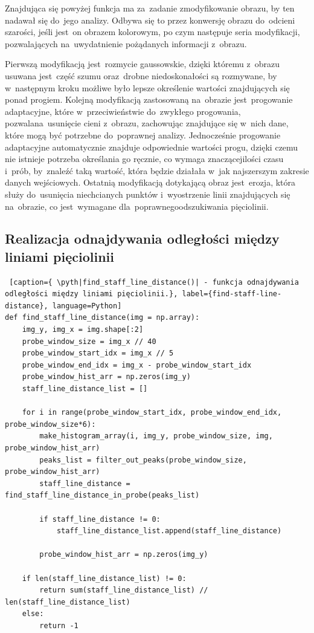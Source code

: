 Znajdująca się powyżej funkcja ma za~zadanie zmodyfikowanie obrazu, by ten nadawał się do~jego analizy. Odbywa się to przez konwersję obrazu do~odcieni szarości, jeśli jest~on obrazem kolorowym, po czym następuje seria modyfikacji, pozwalających na~uwydatnienie pożądanych \linebreak informacji z~obrazu.

Pierwszą modyfikacją jest~rozmycie gaussowskie, dzięki któremu z~obrazu usuwana jest~część szumu oraz~drobne niedoskonałości są rozmywane, by w~następnym kroku możliwe było lepsze określenie wartości znajdujących się ponad progiem. Kolejną modyfikacją zastosowaną na~obrazie jest~progowanie adaptacyjne, które w~przeciwieństwie do~zwykłego progowania, pozwala\linebreak na~usunięcie cieni z~obrazu, zachowując znajdujące się w~nich dane, które mogą być potrzebne do~poprawnej analizy. Jednocześnie progowanie adaptacyjne automatycznie znajduje odpowiednie wartości progu, dzięki czemu nie istnieje potrzeba określania go ręcznie, co wymaga znaczącej\linebreak ilości czasu i~prób, by~znaleźć taką wartość, która będzie działała w~jak najszerszym zakresie danych wejściowych. Ostatnią modyfikacją dotykającą obraz jest~erozja, która służy do~usunięcia niechcianych punktów i~wyostrzenie linii znajdujących się na~obrazie, co jest~wymagane dla~poprawnego\linebreak odszukiwania pięciolinii.

\newpage

\subsection{Realizacja odnajdywania odległości między liniami pięciolinii} \label{find_staff_line_distance_impl}

\begin{lstlisting} [caption={ \pyth|find_staff_line_distance()| - funkcja odnajdywania odległości między liniami pięciolinii.}, label={find-staff-line-distance}, language=Python]
def find_staff_line_distance(img = np.array):
	img_y, img_x = img.shape[:2]
	probe_window_size = img_x // 40
	probe_window_start_idx = img_x // 5
	probe_window_end_idx = img_x - probe_window_start_idx
	probe_window_hist_arr = np.zeros(img_y)
	staff_line_distance_list = []
	
	for i in range(probe_window_start_idx, probe_window_end_idx, probe_window_size*6):
		make_histogram_array(i, img_y, probe_window_size, img, probe_window_hist_arr)
		peaks_list = filter_out_peaks(probe_window_size, probe_window_hist_arr)
		staff_line_distance = find_staff_line_distance_in_probe(peaks_list)
		
		if staff_line_distance != 0:
			staff_line_distance_list.append(staff_line_distance)
		
		probe_window_hist_arr = np.zeros(img_y)
	
	if len(staff_line_distance_list) != 0:
		return sum(staff_line_distance_list) // len(staff_line_distance_list)
	else:
		return -1
\end{lstlisting}

